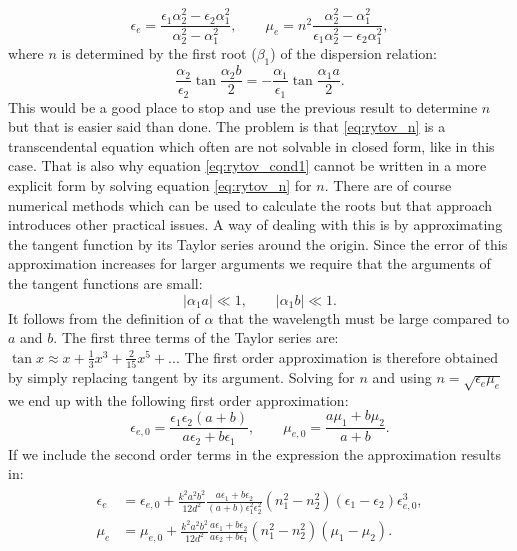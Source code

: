 \begin{equation}
    \epsilon_e = \frac{\epsilon_1 \alpha_2^2 - \epsilon_2 \alpha_1^2}{\alpha_2^2-\alpha_1^2},
    \qquad
    \mu_e = n^2\frac{\alpha_2^2-\alpha_1^2}{\epsilon_1 \alpha_2^2 - \epsilon_2 \alpha_1^2},
\end{equation}
where $n$ is determined by the first root ($\beta_1$) of the dispersion relation:
\begin{equation}
    \label{eq:rytov_n}
    \frac{\alpha_2}{\epsilon_2}\tan \frac{\alpha_2 b}{2} = -\frac{\alpha_1}{\epsilon_1}\tan \frac{\alpha_1 a}{2}.    
\end{equation}
This would be a good place to stop and use the previous result to determine $n$ but that is easier said than done. The problem is that \ref{eq:rytov_n} is a transcendental equation which often are not solvable in closed form, like in this case. That is also why equation \ref{eq:rytov_cond1} cannot be written in a more explicit form by solving equation \ref{eq:rytov_n} for $n$. There are of course numerical methods which can be used to calculate the roots but that approach introduces other practical issues. A way of dealing with this is by approximating the tangent function by its Taylor series around the origin. Since the error of this approximation increases for larger arguments we require that the arguments of the tangent functions are small:
\begin{equation}
    |\alpha_1 a| \ll 1, 
    \qquad
    |\alpha_1 b| \ll 1.
\end{equation}
It follows from the definition of $\alpha$ that the wavelength must be large compared to $a$ and $b$. The first three terms of the Taylor series are: $\tan x \approx x + \frac{1}{3}x^3 + \frac{2}{15}x^5 + ...$ The first order approximation is therefore obtained by simply replacing tangent by its argument. Solving for $n$ and using $n=\sqrt{\epsilon_e \mu_e}$ we end up with the following first order approximation:
\begin{equation}
    \label{eq:rytov_1st_order}
    \epsilon_{e,0} = \frac{\epsilon_1 \epsilon_2 (a+b)}{a\epsilon_2+b\epsilon_1},
    \qquad
    \mu_{e,0} = \frac{a\mu_1+b\mu_2}{a+b}.
\end{equation}
If we include the second order terms in the expression the approximation results in:
\begin{align}
\begin{split}
    \label{eq:rytov_2nd_order}
    \epsilon_{e} &= \epsilon_{e,0} + \frac{k^2a^2b^2}{12d^2} \frac{a\epsilon_1+b\epsilon_2}{(a+b)\epsilon_1^2\epsilon_2^2}\left(n_1^2-n_2^2\right)\left(\epsilon_1-\epsilon_2\right)\epsilon_{e,0}^3,
    \\
    \mu_{e} &= \mu_{e,0} + \frac{k^2a^2b^2}{12d^2}\frac{a\epsilon_1 + b\epsilon_2}{a\epsilon_2 + b\epsilon_1}\left(n_1^2-n_2^2\right)\left(\mu_1-\mu_2\right).
\end{split}
\end{align}
